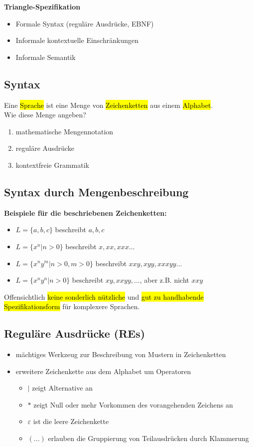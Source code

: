 \documentclass[a4paper, 10pt]{article}
\begin{document}
 \noindent\begin{definitionbox}
     \textbf{Triangle-Spezifikation}
     \begin{itemize}
         \item Formale Syntax (reguläre Ausdrücke, EBNF)
         \item Informale kontextuelle Einschränkungen
         \item Informale Semantik
     \end{itemize}
 \end{definitionbox}

 \subsection{Syntax}
 Eine \hl{Sprache} ist eine Menge von \hl{Zeichenketten} aus einem \hl{Alphabet}.\\[2mm]
 Wie diese Menge angeben?
 \begin{enumerate}
     \item mathematische Mengennotation
     \item reguläre Ausdrücke 
     \item kontextfreie Grammatik
 \end{enumerate}
 \subsection{Syntax durch Mengenbeschreibung}
 \textbf{Beispiele für die beschriebenen Zeichenketten:}
 \begin{itemize}
     \item $L = \{a,b,c\}$ beschreibt $a,b,c$
     \item $L = \{x^n |n > 0 \}$ beschreibt $x, xx, xxx...$
     \item $L = \{ x^ny^m | n>0, m>0\}$ beschreibt $xxy, xyy, xxxyy...$
     \item $L = \{x^ny^n | n > 0\}$ beschreibt $xy, xxyy,...$, aber z.B. nicht $xxy$
 \end{itemize}
 Offensichtlich \hl{keine sonderlich nützliche} und \hl{gut zu handhabende Spezifikationsform} für komplexere Sprachen.

 \subsection{Reguläre Ausdrücke (REs)}
 \begin{itemize}
     \item  mächtiges Werkzeug zur Beschreibung von Mustern in Zeichenketten
     \item erweitere Zeichenkette aus dem Alphabet um Operatoren
     \begin{itemize}
         \item $|$ zeigt Alternative an
         \item $*$ zeigt Null oder mehr Vorkommen des vorangehenden Zeichens an
         \item $\varepsilon$ ist die leere Zeichenkette
         \item $(...)$ erlauben die Gruppierung von Teilausdrücken durch Klammerung
     \end{itemize}
 \end{itemize}
\end{document}
